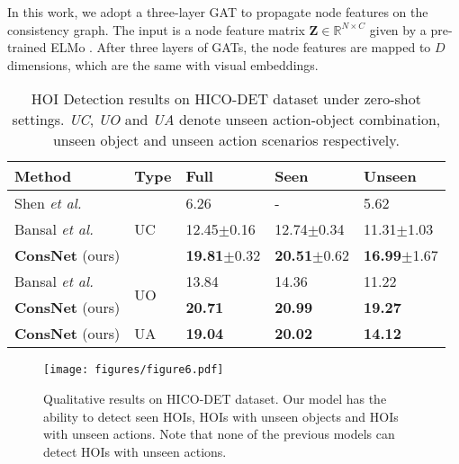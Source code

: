 \documentclass[sigconf,screen]{acmart}
\begin{document}
In this work, we adopt a three-layer GAT to propagate node features on the consistency graph. The input is a node feature matrix $\textbf{Z} \in \mathbb{R}^{N \times C}$ given by a pre-trained ELMo \cite{peters2018deep}. After three layers of GATs, the node features are mapped to $D$ dimensions, which are the same with visual embeddings.

\begin{table}
\renewcommand\tabcolsep{4pt}
\newcommand{\beforefulloffset}{\hspace{-0.1cm}}
\newcommand{\beforeseenoffset}{\hspace{-0.6cm}}
\newcommand{\beforeunseenoffset}{\hspace{-1.1cm}}
\caption{HOI Detection results on HICO-DET dataset under zero-shot settings. \textit{UC}, \textit{UO} and \textit{UA} denote unseen action-object combination, unseen object and unseen action scenarios respectively.}
\label{tab:3}
\begin{tabularx}{\linewidth}{p{2.15cm}<{\raggedright}|p{0.7cm}<{\centering}|p{1.6cm}<{\centering}p{1.6cm}<{\centering}p{1.6cm}<{\centering}}
\toprule
\textbf{Method}&\textbf{Type}&\beforefulloffset\textbf{Full}&\beforeseenoffset\textbf{Seen}&\beforeunseenoffset\textbf{Unseen}\\
\midrule
Shen \textit{et al.} \cite{shen2018scaling}&\multirow{3}{*}{UC}&\beforefulloffset6.26&\beforeseenoffset-&\beforeunseenoffset5.62\\
Bansal \textit{et al.} \cite{bansal2019detecting}&&\beforefulloffset12.45$\pm$0.16&\beforeseenoffset12.74$\pm$0.34&\beforeunseenoffset11.31$\pm$1.03\\
\textbf{ConsNet} (ours)&&\beforefulloffset\textbf{19.81}$\pm$0.32&\beforeseenoffset\textbf{20.51}$\pm$0.62&\beforeunseenoffset\textbf{16.99}$\pm$1.67\\
\midrule
Bansal \textit{et al.} \cite{bansal2019detecting}&\multirow{2}{*}{UO}&\beforefulloffset13.84&\beforeseenoffset14.36&\beforeunseenoffset11.22\\
\textbf{ConsNet} (ours)&&\beforefulloffset\textbf{20.71}&\beforeseenoffset\textbf{20.99}&\beforeunseenoffset\textbf{19.27}\\
\midrule
\textbf{ConsNet} (ours)&UA&\beforefulloffset\textbf{19.04}&\beforeseenoffset\textbf{20.02}&\beforeunseenoffset\textbf{14.12}\\
\bottomrule
\end{tabularx}
\end{table}

\begin{figure*}
\centering
\texttt{[image: figures/figure6.pdf]}
\caption{Qualitative results on HICO-DET dataset. Our model has the ability to detect seen HOIs, HOIs with unseen objects and HOIs with unseen actions. Note that none of the previous models can detect HOIs with unseen actions.}
\label{fig6}
\end{figure*}
\end{document}
